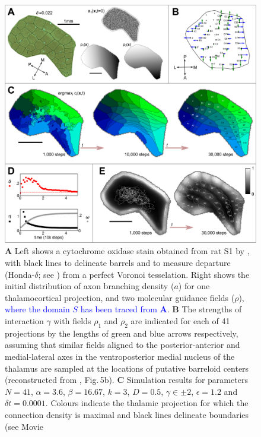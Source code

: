 \documentclass[9pt,lineno]{elife}
\newcommand{\cmnt}[1]{\textcolor{blue}{#1}}
\newcommand{\MPone}[1]{\textcolor{revpink}{#1}}
\newcommand{\MPtwo}[1]{\textcolor{revblue}{#1}}
\begin{document}
\begin{figure}
  \begin{fullwidth}
    \includegraphics[width=\linewidth]{./Fig1.png}
    \caption{\textbf{A} Left shows a cytochrome oxidase stain obtained from rat S1
      by \cite{zheng_signal_2001}, with black lines to delineate barrels and to
      measure departure (Honda-$\delta$; see \citealp{senft_mouse_1991}) from a
      perfect Voronoi tesselation. Right shows the initial distribution of axon
      branching density ($a$) for one thalamocortical projection, and two
      molecular guidance fields ($\rho$), \cmnt{where the domain $S$ has been
        traced from \textbf{A}}. \textbf{B} The strengths of interaction
      $\gamma$ with fields $\rho_1$ and $\rho_2$ are indicated for each of 41
      projections by the lengths of green and blue arrows respectively, assuming
      that similar fields aligned to the posterior-anterior and medial-lateral
      axes in the ventroposterior medial nucleus of the thalamus are sampled at
      the locations of putative barreloid centers (reconstructed from
      \citealp{haidarliu_size_2001}, \MPone{Fig.\,5b}). \textbf{C} Simulation results for parameters
      \MPtwo{$N=41$, $\alpha=3.6$, $\beta=16.67$, $k=3$, $D=0.5$, $\gamma\in\pm 2$,
      $\epsilon=1.2$} and $\delta{t}=0.0001$. Colours indicate the thalamic
      projection for which the connection density is maximal and black lines
      delineate boundaries (see Movie
}
\end{fullwidth}
\end{figure}
\end{document}
